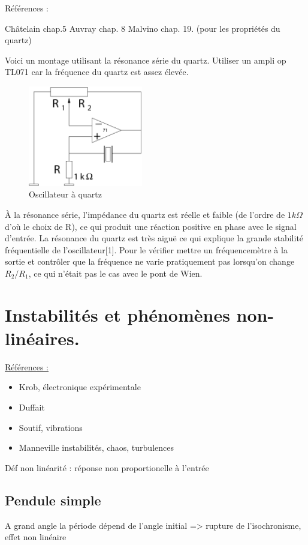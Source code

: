 \documentclass{article}%
\begin{document}
Références :

    Châtelain chap.5
    Auvray chap. 8
    Malvino chap. 19. (pour les propriétés du quartz)

Voici un montage utilisant la résonance série du quartz. Utiliser un ampli op TL071 car la fréquence du quartz est assez élevée.
\begin{figure}
	\centerline{\includegraphics[width=5cm]{images-exp/Oscill8.png}}
	\caption{Oscillateur à quartz}
\end{figure}

À la résonance série, l'impédance du quartz est réelle et faible (de l'ordre de $1k\Omega$ d'où le choix de R), ce qui produit une réaction positive en phase avec le signal d'entrée. La résonance du quartz est très aiguë ce qui explique la grande stabilité fréquentielle de l'oscillateur[1]. Pour le vérifier mettre un fréquencemètre à la sortie et contrôler que la fréquence ne varie pratiquement pas lorsqu'on change $R_2 /R_1 $, ce qui n'était pas le cas avec le pont de Wien. 

\section{Instabilités et phénomènes non-linéaires.}
\underline{Références :}
\begin{itemize}
	\item Krob, électronique expérimentale
	\item Duffait
	\item Soutif, vibrations
	\item Manneville instabilités, chaos, turbulences
\end{itemize}
Déf non linéarité : réponse non proportionelle à l'entrée

\subsection{Pendule simple}

A grand angle la période dépend de l'angle initial => rupture de l'isochronisme, effet non linéaire
\end{document}
